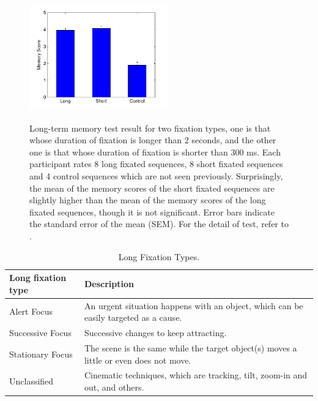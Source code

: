 \documentclass[10pt,letterpaper]{article}
\begin{document}
\begin{figure}
  \centerline{\includegraphics[width=60mm,height=54mm,trim=9mm 3mm 12mm 3mm]{./eps/memtest_leng}}
  \caption{Long-term memory test result for two fixation types, one is that whose duration of fixation is longer than 2 seconds, and the other one is that whose duration of fixation is shorter than 300 ms. Each participant rates 8 long fixated sequences, 8 short fixated sequences and 4 control sequences which are not seen previously. Surprisingly, the mean of the memory scores of the short fixated sequences are slightly higher than the mean of the memory scores of the long fixated sequences, though it is not significant. Error bars indicate the standard error of the mean (SEM). For the detail of test, refer to \textit{}.}
  \label{fig:memtest-leng}
\end{figure}

\begin{table}[!ht]
\begin{center} 
\caption{Long Fixation Types.} 
\label{tab:long-fixation-types} 
\vskip 0.12in
\begin{tabular}{ll} 
\hline
Long fixation type    &  Description \\
\hline
Alert Focus           &   An urgent situation happens with an object, 
                          which can be easily targeted as a cause. \\
Successive Focus      &   Successive changes to keep attracting. \\
Stationary Focus      &   The scene is the same while the target object(s)
                          moves a little or even does not move. \\
Unclassified          &   Cinematic techniques, which are tracking, tilt, 
                          zoom-in and out, and others. \\
\hline
\end{tabular} 
\end{center} 
\end{table}
\end{document}
